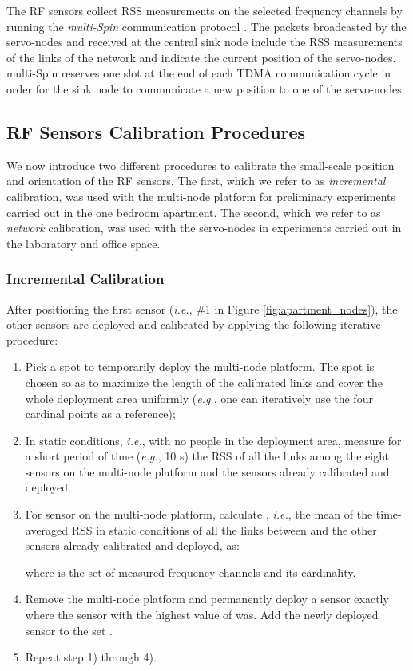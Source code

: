 \documentclass[conference]{IEEEtran}
\begin{document}
The RF sensors collect RSS measurements on the selected frequency channels by running the \emph{multi-Spin} communication protocol \cite{EvAAL_book}. The packets broadcasted by the servo-nodes and received at the central sink node include the RSS measurements of the links of the network and indicate the current position of the servo-nodes. multi-Spin reserves one slot at the end of each TDMA communication cycle in order for the sink node to communicate a new position to one of the servo-nodes.



\subsection{RF Sensors Calibration Procedures}
\label{sec:calibration_procedures}

We now introduce two different procedures to calibrate the small-scale position and orientation of the RF sensors. The first, which we refer to as \emph{incremental} calibration, was used with the multi-node platform for preliminary experiments carried out in the one bedroom apartment. The second, which we refer to as \emph{network} calibration, was used with the servo-nodes in experiments carried out in the laboratory and office space.

\subsubsection{Incremental Calibration}
\label{sec:incremental_calibration}

After positioning the first sensor (\emph{i.e.}, \#1 in Figure \ref{fig:apartment_nodes}), the other sensors are deployed and calibrated by applying the following iterative procedure:
\begin{enumerate}
    \item Pick a spot to temporarily deploy the multi-node platform. The spot is chosen so as to maximize the length of the calibrated links and cover the whole deployment area uniformly (\emph{e.g.}, one can iteratively use the four cardinal points as a reference);
    \item In static conditions, \emph{i.e.}, with no people in the deployment area, measure for a short period of time (\emph{e.g.}, 10 s) the RSS of all the links among the eight sensors on the multi-node platform and the sensors already calibrated and deployed.
    \item For sensor  on the multi-node platform, calculate , \emph{i.e.}, the mean of the time-averaged RSS in static conditions of all the links between  and the other sensors  already calibrated and deployed, as:
        
    where  is the set of measured frequency channels and  its cardinality.
    \item Remove the multi-node platform and permanently deploy a sensor exactly where the sensor  with the highest value of  was. Add the newly deployed sensor to the set .
    \item Repeat step 1) through 4).
\end{enumerate}
\end{document}
